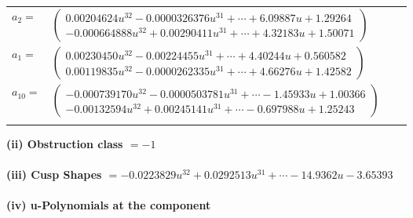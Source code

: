 \documentclass[1p]{elsarticle_modified}
\theoremstyle{definition}
\begin{document}
\begin{tabular}{m{7pt} m{180pt} m{7pt} m{180pt} }
\flushright $a_{2}=$&$\begin{pmatrix}0.00204624 u^{32}-0.0000326376 u^{31}+\cdots+6.09887 u+1.29264\\-0.000664888 u^{32}+0.00290411 u^{31}+\cdots+4.32183 u+1.50071\end{pmatrix}$ \\
\flushright $a_{1}=$&$\begin{pmatrix}0.00230450 u^{32}-0.00224455 u^{31}+\cdots+4.40244 u+0.560582\\0.00119835 u^{32}-0.0000262335 u^{31}+\cdots+4.66276 u+1.42582\end{pmatrix}$ \\
\flushright $a_{10}=$&$\begin{pmatrix}-0.000739170 u^{32}-0.0000503781 u^{31}+\cdots-1.45933 u+1.00366\\-0.00132594 u^{32}+0.00245141 u^{31}+\cdots-0.697988 u+1.25243\end{pmatrix}$\\&\end{tabular}
\flushleft \textbf{(ii) Obstruction class $= -1$}\\~\\
\flushleft \textbf{(iii) Cusp Shapes $= -0.0223829 u^{32}+0.0292513 u^{31}+\cdots-14.9362 u-3.65393$}\\~\\
\newpage\renewcommand{\arraystretch}{1}
\flushleft \textbf{(iv) u-Polynomials at the component}\newline \\
\end{document}
